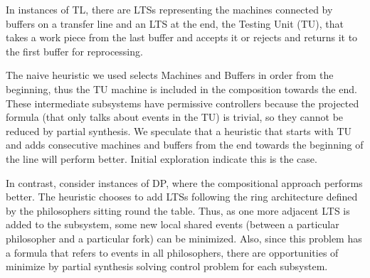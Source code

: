 In instances of TL, there are LTSs representing the machines connected by buffers on a transfer line and an LTS at the end, the Testing Unit (TU), that takes a work piece from the last buffer and accepts it or rejects and returns it to the first buffer for reprocessing.

The naive heuristic we used selects Machines and Buffers in order from the beginning, thus the TU machine is included in the composition towards the end. These intermediate subsystems have permissive controllers because the projected formula (that only talks about events in the TU) is trivial, so they cannot be reduced by partial synthesis. We speculate that a heuristic that starts with TU and adds consecutive machines and buffers from the end towards the beginning of the line will perform better. Initial exploration indicate this is the case. 

In contrast, consider instances of DP, where the compositional approach performs better. The heuristic chooses to add LTSs following the ring architecture defined by the philosophers sitting round the table. Thus, as one more adjacent LTS is added to the subsystem, some new local shared events (between a particular philosopher and a particular fork) can be minimized. Also, since this problem has a formula that refers to events in all philosophers, there are opportunities of minimize by partial synthesis solving control problem for each subsystem.




